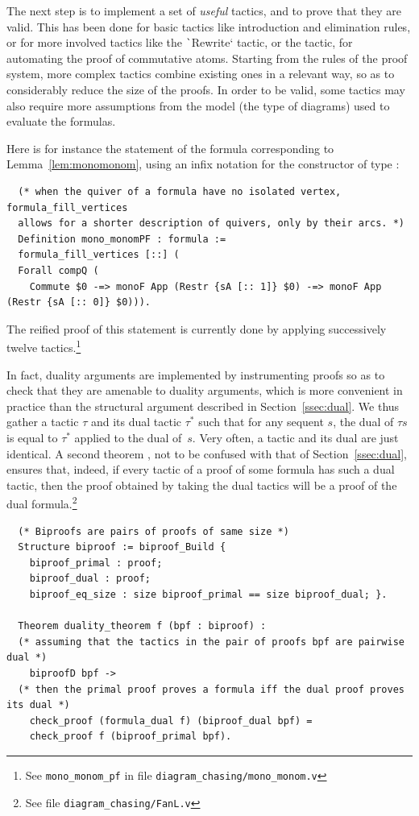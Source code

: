 \documentclass[a4paper,UKenglish,cleveref, autoref, thm-restate]{lipics-v2021}
\begin{document}
The next step is to implement a set of \emph{useful} tactics, and to prove that they are valid. This has been done for basic tactics like introduction and elimination rules, or for more involved tactics like the \texttt`Rewrite` tactic, or the  tactic, for automating the proof of commutative atoms. Starting from the rules of the proof system, more complex tactics combine existing ones in a relevant way, so as to considerably reduce the size of the proofs. In order to be valid, some tactics may also require more assumptions from the model (the type of diagrams) used to evaluate the formulas.

Here is for instance the statement of the formula corresponding to Lemma~\ref{lem:monomonom}, using an infix notation \coqescape{-=>} for the  constructor of type :
\begin{verbatim}
  (* when the quiver of a formula have no isolated vertex, formula_fill_vertices
  allows for a shorter description of quivers, only by their arcs. *)
  Definition mono_monomPF : formula :=
  formula_fill_vertices [::] (
  Forall compQ (
    Commute $0 -=> monoF App (Restr {sA [:: 1]} $0) -=> monoF App (Restr {sA [:: 0]} $0))).
\end{verbatim}

The reified proof of this statement is currently done by applying successively twelve tactics.\footnote{See \texttt{mono\_monom\_pf} in file \texttt{diagram\_chasing/mono\_monom.v}}

In fact, duality arguments are implemented by instrumenting proofs so as to check that they are amenable to duality arguments, which is more convenient in practice than the structural argument described in Section~\ref{ssec:dual}. We thus gather a tactic $\tau$ and its dual tactic $\tau^*$ such that for any sequent $s$, the dual of $\tau s$ is equal to $\tau^*$ applied to the dual of~$s$. Very often, a tactic and its dual are just identical. A second theorem , not to be confused with that of Section~\ref{ssec:dual}, ensures that, indeed, if every tactic of a proof of some formula has such a dual tactic, then the proof obtained by taking the dual tactics will be a proof of the dual formula.\footnote{See file \texttt{diagram\_chasing/FanL.v}}

\begin{verbatim}
  (* Biproofs are pairs of proofs of same size *)
  Structure biproof := biproof_Build {
    biproof_primal : proof;
    biproof_dual : proof;
    biproof_eq_size : size biproof_primal == size biproof_dual; }.

  Theorem duality_theorem f (bpf : biproof) :
  (* assuming that the tactics in the pair of proofs bpf are pairwise dual *)
    biproofD bpf ->
  (* then the primal proof proves a formula iff the dual proof proves its dual *)
    check_proof (formula_dual f) (biproof_dual bpf) =
    check_proof f (biproof_primal bpf).
\end{verbatim}
\end{document}
